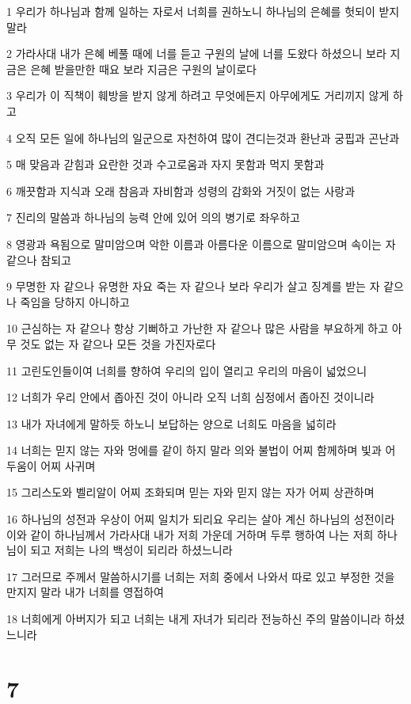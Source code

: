 \par 1 우리가 하나님과 함께 일하는 자로서 너희를 권하노니 하나님의 은혜를 헛되이 받지 말라
\par 2 가라사대 내가 은혜 베풀 때에 너를 듣고 구원의 날에 너를 도왔다 하셨으니 보라 지금은 은혜 받을만한 때요 보라 지금은 구원의 날이로다
\par 3 우리가 이 직책이 훼방을 받지 않게 하려고 무엇에든지 아무에게도 거리끼지 않게 하고
\par 4 오직 모든 일에 하나님의 일군으로 자천하여 많이 견디는것과 환난과 궁핍과 곤난과
\par 5 매 맞음과 갇힘과 요란한 것과 수고로움과 자지 못함과 먹지 못함과
\par 6 깨끗함과 지식과 오래 참음과 자비함과 성령의 감화와 거짓이 없는 사랑과
\par 7 진리의 말씀과 하나님의 능력 안에 있어 의의 병기로 좌우하고
\par 8 영광과 욕됨으로 말미암으며 악한 이름과 아름다운 이름으로 말미암으며 속이는 자 같으나 참되고
\par 9 무명한 자 같으나 유명한 자요 죽는 자 같으나 보라 우리가 살고 징계를 받는 자 같으나 죽임을 당하지 아니하고
\par 10 근심하는 자 같으나 항상 기뻐하고 가난한 자 같으나 많은 사람을 부요하게 하고 아무 것도 없는 자 같으나 모든 것을 가진자로다
\par 11 고린도인들이여 너희를 향하여 우리의 입이 열리고 우리의 마음이 넓었으니
\par 12 너희가 우리 안에서 좁아진 것이 아니라 오직 너희 심정에서 좁아진 것이니라
\par 13 내가 자녀에게 말하듯 하노니 보답하는 양으로 너희도 마음을 넓히라
\par 14 너희는 믿지 않는 자와 멍에를 같이 하지 말라 의와 불법이 어찌 함께하며 빛과 어두움이 어찌 사귀며
\par 15 그리스도와 벨리알이 어찌 조화되며 믿는 자와 믿지 않는 자가 어찌 상관하며
\par 16 하나님의 성전과 우상이 어찌 일치가 되리요 우리는 살아 계신 하나님의 성전이라 이와 같이 하나님께서 가라사대 내가 저희 가운데 거하며 두루 행하여 나는 저희 하나님이 되고 저희는 나의 백성이 되리라 하셨느니라
\par 17 그러므로 주께서 말씀하시기를 너희는 저희 중에서 나와서 따로 있고 부정한 것을 만지지 말라 내가 너희를 영접하여
\par 18 너희에게 아버지가 되고 너희는 내게 자녀가 되리라 전능하신 주의 말씀이니라 하셨느니라

\chapter{7}

